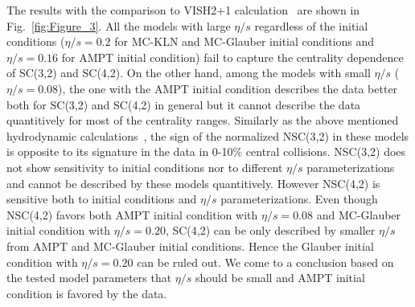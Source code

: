 The results with the comparison to VISH2+1 calculation~\cite{Zhu:2016puf} are shown in Fig.~\ref{fig:Figure_3}.  All the models with large $\eta/s$ regardless of the initial conditions ($\eta/s=0.2$ for MC-KLN and MC-Glauber initial conditions and $\eta/s=0.16$ for AMPT initial condition) fail to capture the centrality dependence of SC(3,2) and SC(4,2). 
On the other hand, among the models with small $\eta/s$ ($\eta/s=0.08$), the one with the AMPT initial condition describes the data better both for SC(3,2) and SC(4,2) in general but it cannot describe the data quantitively for most of the centrality ranges.
Similarly as the above mentioned hydrodynamic calculations~\cite{Niemi:2015qia}, the sign of the normalized NSC(3,2) in these models is opposite to its signature in the data in 0-10\% central collisions. NSC(3,2) does not show sensitivity to initial conditions nor to different $\eta/s$ parameterizations and cannot be described by these models quantitively.
However NSC(4,2) is sensitive both to initial conditions and $\eta/s$ parameterizations.
Even though NSC(4,2) favors both AMPT initial condition with $\eta/s=0.08$ and MC-Glauber initial condition with $\eta/s=0.20$,
SC(4,2) can be only described by smaller $\eta/s$ from AMPT and MC-Glauber initial conditions. Hence the Glauber initial condition with $\eta/s=0.20$ can be ruled out. We come to a conclusion based on the tested model parameters that $\eta/s$ should be small and AMPT initial condition is favored by the data.

